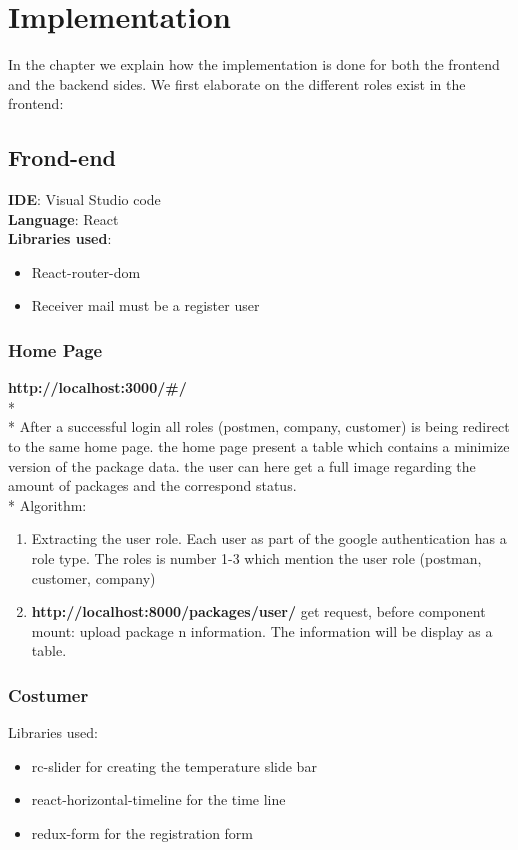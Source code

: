 \chapter{Implementation}
\label{cha:implementation}

In the chapter we explain how the implementation is done for both the frontend and the backend sides.
We first elaborate on the different roles exist in the frontend:

\section{Frond-end}

\textbf{IDE}: Visual Studio code\\
\textbf{Language}: React\\
\textbf{Libraries used}:
\begin{itemize}
    \item React-router-dom
    \item Receiver mail must be a register user
\end{itemize}


\subsection{Home Page}
\textbf{http://localhost:3000/\#/}\\*
\\*
After a successful login all roles (postmen, company, customer) is being redirect to the same home page.
the home page present a table which contains a minimize version of the package data.
the user can here get a full image regarding the amount of packages and the correspond status.\\*
Algorithm:
\begin{enumerate}
    \item Extracting the user role. Each user as part of the google authentication has a role type. The roles is number 1-3 which mention the user role (postman, customer, company) 
    \item \textbf{http://localhost:8000/packages/user/}  get request, before component mount: upload package n information. The information will be display as a table.
\end{enumerate}



\subsection{Costumer}
Libraries used:
\begin{itemize}
\item rc-slider for creating the temperature slide bar 
\item react-horizontal-timeline for the time line
\item redux-form for the registration form
\end{itemize}


